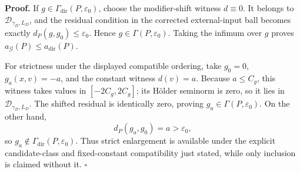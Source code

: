 \textbf{Proof.}
If \(g\in\Gamma_{\mathrm{dir}}(P,\varepsilon_0)\), choose the modifier-shift witness \(d\equiv0\). It belongs to \(\mathcal D_{\gamma_D,L_D}\), and the residual condition in the corrected external-input ball becomes exactly \(d_P(g,g_0)\le\varepsilon_0\). Hence \(g\in\Gamma(P,\varepsilon_0)\). Taking the infimum over \(g\) proves \(a_{\mathcal G}(P)\le a_{\mathrm{dir}}(P)\).

For strictness under the displayed compatible ordering, take \(g_0=0\), \(g_a(x,v)=-a\), and the constant witness \(d(v)=a\). Because \(a\le C_g\), this witness takes values in \([-2C_g,2C_g]\); its H\"older seminorm is zero, so it lies in \(\mathcal D_{\gamma_D,L_D}\). The shifted residual is identically zero, proving \(g_a\in\Gamma(P,\varepsilon_0)\). On the other hand,
\[
 d_P(g_a,g_0)=a>\varepsilon_0,
\]
so \(g_a\notin\Gamma_{\mathrm{dir}}(P,\varepsilon_0)\). Thus strict enlargement is available under the explicit candidate-class and fixed-constant compatibility just stated, while only inclusion is claimed without it. \(\square\)